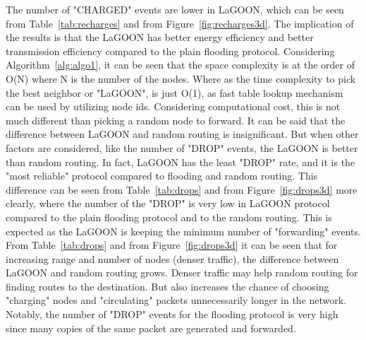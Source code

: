 \documentclass[12pt, oneandhalf, chaparabic, sees, ms]{metu}
\begin{document}
The number of "CHARGED" events are lower in LaGOON, which can be seen from Table~\ref{tab:recharges} and from Figure~\ref{fig:recharges3d}.
The implication of the results is that the LaGOON has better energy efficiency and better transmission efficiency compared to the plain flooding protocol. 
Considering Algorithm~\ref{alg:algo1}, it can be seen that the space complexity is at the order of O(N) where N is the number of the nodes. 
Where as the time complexity to pick the best neighbor or "LaGOON", is just O(1), as fast table lookup mechanism can be used by utilizing node ids. 
Considering computational cost, this is not much different than picking a random node to forward. 
It can be said that the difference between LaGOON and random routing is insignificant. But when other factors are considered, 
like the number of "DROP" events, the LaGOON is better than random routing. In fact, LaGOON has the least "DROP" rate, and it is
the "most reliable" protocol compared to flooding and random routing. 
This difference can be seen from Table~\ref{tab:drops} and from Figure~\ref{fig:drops3d} more clearly,
where the number of the "DROP" is very low in LaGOON protocol compared to the plain flooding protocol and to the random routing.
This is expected as the LaGOON is keeping the minimum number of "forwarding" events. 
From Table~\ref{tab:drops} and from Figure~\ref{fig:drops3d} it can be seen that for increasing range and number of nodes (denser traffic), 
the difference between LaGOON and random routing grows. Denser traffic may 
help random routing for finding routes to the destination. But also increases the chance of choosing "charging" nodes and "circulating" packets 
unnecessarily longer in the network. Notably, the number of "DROP" events for the flooding protocol is very high since many copies of 
the same packet are generated and forwarded.
\end{document}
